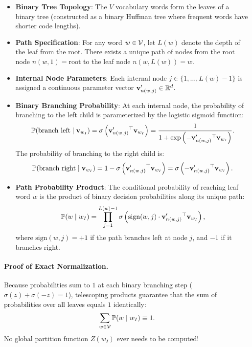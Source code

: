 \documentclass[../../main.tex]{subfiles}
\begin{document}
\begin{itemize}
    \item \textbf{Binary Tree Topology}: The $V$ vocabulary words form the leaves of a binary tree (constructed as a binary Huffman tree where frequent words have shorter code lengths).
    \item \textbf{Path Specification}: For any word $w \in \mathcal{V}$, let $L(w)$ denote the depth of the leaf from the root. There exists a unique path of nodes from the root node $n(w, 1) = \text{root}$ to the leaf node $n(w, L(w)) = w$.
    \item \textbf{Internal Node Parameters}: Each internal node $j \in \{1, \dots, L(w)-1\}$ is assigned a continuous parameter vector $\mathbf{v}'_{n(w, j)} \in \mathbb{R}^d$.
    \item \textbf{Binary Branching Probability}: At each internal node, the probability of branching to the left child is parameterized by the logistic sigmoid function:
    \begin{equation}
    \label{eq:hierarchical_branch}
    \mathbb{P}(\text{branch left} \mid \mathbf{v}_{w_I}) = \sigma\left( \mathbf{v}'_{n(w, j)}{}^\top \mathbf{v}_{w_I} \right) = \frac{1}{1 + \exp\left( -\mathbf{v}'_{n(w, j)}{}^\top \mathbf{v}_{w_I} \right)}.
    \end{equation}
    The probability of branching to the right child is:
    \begin{equation}
    \label{eq:hierarchical_right}
    \mathbb{P}(\text{branch right} \mid \mathbf{v}_{w_I}) = 1 - \sigma\left( \mathbf{v}'_{n(w, j)}{}^\top \mathbf{v}_{w_I} \right) = \sigma\left( -\mathbf{v}'_{n(w, j)}{}^\top \mathbf{v}_{w_I} \right).
    \end{equation}
    \item \textbf{Path Probability Product}: The conditional probability of reaching leaf word $w$ is the product of binary decision probabilities along its unique path:
    \begin{equation}
    \label{eq:hierarchical_softmax}
    \mathbb{P}(w \mid w_I) = \prod_{j=1}^{L(w)-1} \sigma\left( \text{sign}(w, j) \cdot \mathbf{v}'_{n(w, j)}{}^\top \mathbf{v}_{w_I} \right),
    \end{equation}
    where $\text{sign}(w, j) = +1$ if the path branches left at node $j$, and $-1$ if it branches right.
\end{itemize}

\paragraph{Proof of Exact Normalization.}
Because probabilities sum to $1$ at each binary branching step ($\sigma(z) + \sigma(-z) = 1$), telescoping products guarantee that the sum of probabilities over all leaves equals $1$ identically:
\begin{equation}
\label{eq:hierarchical_norm_proof}
\sum_{w \in \mathcal{V}} \mathbb{P}(w \mid w_I) \equiv 1.
\end{equation}
No global partition function $Z(w_I)$ ever needs to be computed!
\end{document}
